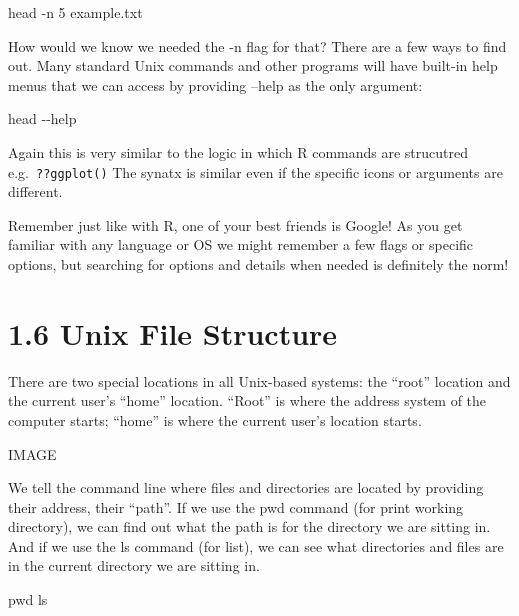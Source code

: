 \documentclass[
]{book}
\newenvironment{Shaded}{\begin{snugshade}}{\end{snugshade}}
\newcommand{\AttributeTok}[1]{\textcolor[rgb]{0.77,0.63,0.00}{#1}}
\newcommand{\BuiltInTok}[1]{#1}
\newcommand{\FunctionTok}[1]{\textcolor[rgb]{0.00,0.00,0.00}{#1}}
\newcommand{\NormalTok}[1]{#1}
\begin{document}
\begin{Shaded}
\begin{Highlighting}[]
    \FunctionTok{head} \AttributeTok{{-}n}\NormalTok{ 5 example.txt}
\end{Highlighting}
\end{Shaded}

How would we know we needed the -n flag for that? There are a few ways to find out. Many standard Unix commands and other programs will have built-in help menus that we can access by providing --help as the only argument:

\begin{Shaded}
\begin{Highlighting}[]
    \FunctionTok{head} \AttributeTok{{-}{-}help}
\end{Highlighting}
\end{Shaded}

Again this is very similar to the logic in which R commands are strucutred e.g.~\texttt{??ggplot()} The synatx is similar even if the specific icons or arguments are different.

Remember just like with R, one of your best friends is Google! As you get familiar with any language or OS we might remember a few flags or specific options, but searching for options and details when needed is definitely the norm!

\hypertarget{unix-file-structure}{%
\section{1.6 Unix File Structure}\label{unix-file-structure}}

There are two special locations in all Unix-based systems: the ``root'' location and the current user's ``home'' location. ``Root'' is where the address system of the computer starts; ``home'' is where the current user's location starts.

IMAGE

We tell the command line where files and directories are located by providing their address, their ``path''. If we use the pwd command (for print working directory), we can find out what the path is for the directory we are sitting in. And if we use the ls command (for list), we can see what directories and files are in the current directory we are sitting in.

\begin{Shaded}
\begin{Highlighting}[]
    \BuiltInTok{pwd}
    \FunctionTok{ls}
\end{Highlighting}
\end{Shaded}
\end{document}
